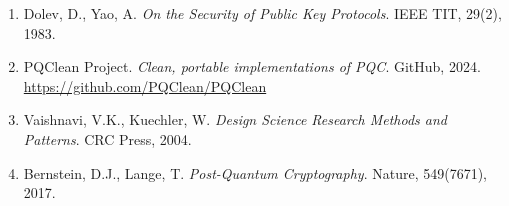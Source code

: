 \documentclass[12pt,a4paper,twoside,openright]{book}
\theoremstyle{plain}
\theoremstyle{definition}
\theoremstyle{remark}
\begin{document}
\begin{enumerate}
  \item Dolev, D., Yao, A. \textit{On the Security of Public Key Protocols}.
    IEEE TIT, 29(2), 1983.

  \item PQClean Project. \textit{Clean, portable implementations of PQC}.
    GitHub, 2024. \url{https://github.com/PQClean/PQClean}

  \item Vaishnavi, V.K., Kuechler, W. \textit{Design Science Research Methods
    and Patterns}. CRC Press, 2004.

  \item Bernstein, D.J., Lange, T. \textit{Post-Quantum Cryptography}.
    Nature, 549(7671), 2017.
\end{enumerate}

\printindex
\end{document}
